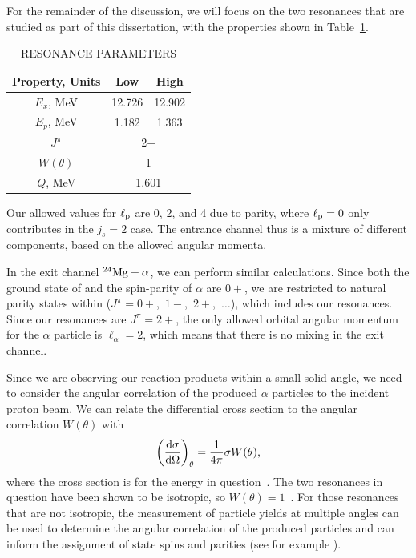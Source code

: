 For the remainder of the discussion, we will focus on the two resonances
that are studied as part of this dissertation, with the properties shown
in Table~\ref{tab:resonance-properties}.

\begin{table}
    \begin{center}
        \caption{RESONANCE PARAMETERS}
        \begin{tabular}{ccc}
            \toprule
            \midrule
                \textbf{Property, Units} & \textbf{Low} & \textbf{High} \\
            \midrule
                $E_{x}$, MeV \cite{NNDC}        & 12.726 & 12.902 \\
                $E_{p}$, MeV                    & 1.182 & 1.363 \\
                $J^{\pi}$ \cite{Nelson1984}     & \multicolumn{2}{c}{2+} \\
                $W(\theta)$ \cite{Andersen1961} & \multicolumn{2}{c}{1} \\
                $Q$, MeV                        & \multicolumn{2}{c}{1.601} \\
            \bottomrule
        \end{tabular}
        \label{tab:resonance-properties}
    \end{center}
\end{table}

Our allowed values for $\ell_{\rm{p}}$ are 0, 2, and 4 due to parity,
where $\ell_{\rm{p}} = 0$ only contributes in the $j_s = 2$ case. The
entrance channel thus is a mixture of different components, based on the
allowed angular momenta.

In the exit channel ${}^{24}\textrm{Mg} + \alpha$, we can perform similar
calculations. Since both the ground state of  and the
spin-parity of $\alpha$ are $0+$, we are restricted to natural parity
states within  ($J^{\pi} = 0+$,~$1-$,~$2+$,~$\ldots$), which
includes our resonances. Since our resonances are $J^{\pi} = 2+$, the
only allowed orbital angular momentum for the $\alpha$ particle is
$\ell_{\alpha} = 2$, which means that there is no mixing in the exit
channel.

Since we are observing our reaction products within a small solid angle,
we need to consider the angular correlation of the produced $\alpha$
particles to the incident proton beam. We can relate the differential
cross section to the angular correlation $W(\theta)$ with
\[
    \left(\frac{\rm{d}\sigma}{\rm{d}\Omega}\right)_{\theta} =
        \frac{1}{4\pi}\sigma W(\theta),
\]
where the cross section is for the energy in question~\cite{Iliadis}.
The two resonances in question have been shown to be isotropic, so
$W(\theta) = 1$~\cite{Andersen1961}. For those resonances that are not
isotropic, the measurement of particle yields at multiple angles can be
used to determine the angular correlation of the produced particles and
can inform the assignment of state spins and parities (see for example
\cite{deBoer2015}).


